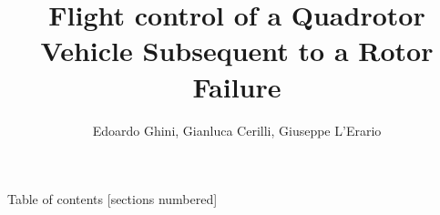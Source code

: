 \documentclass[10pt]{beamer}
\title{Flight control of a Quadrotor Vehicle Subsequent to a	Rotor Failure}
\date{}
\author{Edoardo Ghini, Gianluca Cerilli, Giuseppe L'Erario}
\institute{Modeling and control of multi-rotor UAVs}
\begin{document}
	
	\maketitle
	
\begin{frame}{Table of contents}
	[sections numbered]
	\tableofcontents[hideallsubsections]
\end{frame}





	

\appendix
\end{document}
